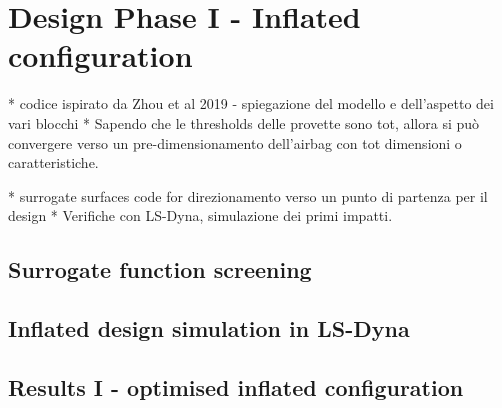\chapter{Design Phase I - Inflated configuration}
\label{chapter-Phase1}


* codice ispirato da Zhou et al 2019 - spiegazione del modello e dell'aspetto dei vari blocchi
* Sapendo che le thresholds delle provette sono tot, allora si può convergere verso un pre-dimensionamento dell'airbag con tot dimensioni o caratteristiche. 

* surrogate surfaces code for direzionamento verso un punto di partenza per il design
* Verifiche con LS-Dyna, simulazione dei primi impatti. 


\section{Surrogate function screening}

\section{Inflated design simulation in LS-Dyna}

\section{Results I - optimised inflated configuration}
